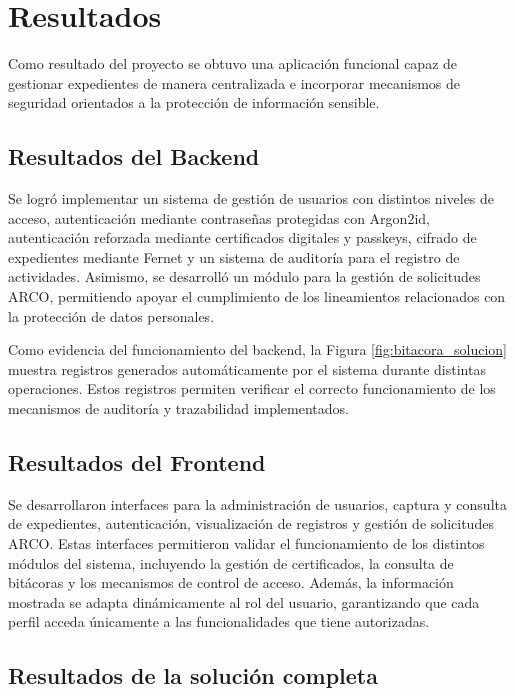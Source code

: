 \documentclass[10pt, letterpaper]{article}
\begin{document}
\section{Resultados}

Como resultado del proyecto se obtuvo una aplicación funcional capaz de gestionar expedientes de manera centralizada e incorporar mecanismos de seguridad orientados a la protección de información sensible.

\subsection{Resultados del Backend}

Se logró implementar un sistema de gestión de usuarios con distintos niveles de acceso, autenticación mediante contraseñas protegidas con Argon2id, autenticación reforzada mediante certificados digitales y passkeys, cifrado de expedientes mediante Fernet y un sistema de auditoría para el registro de actividades. Asimismo, se desarrolló un módulo para la gestión de solicitudes ARCO, permitiendo apoyar el cumplimiento de los lineamientos relacionados con la protección de datos personales.

Como evidencia del funcionamiento del backend, la Figura \ref{fig:bitacora_solucion} muestra registros generados automáticamente por el sistema durante distintas operaciones. Estos registros permiten verificar el correcto funcionamiento de los mecanismos de auditoría y trazabilidad implementados.

\subsection{Resultados del Frontend}

Se desarrollaron interfaces para la administración de usuarios, captura y consulta de expedientes, autenticación, visualización de registros y gestión de solicitudes ARCO. Estas interfaces permitieron validar el funcionamiento de los distintos módulos del sistema, incluyendo la gestión de certificados, la consulta de bitácoras y los mecanismos de control de acceso. Además, la información mostrada se adapta dinámicamente al rol del usuario, garantizando que cada perfil acceda únicamente a las funcionalidades que tiene autorizadas.

\subsection{Resultados de la solución completa}
\end{document}

